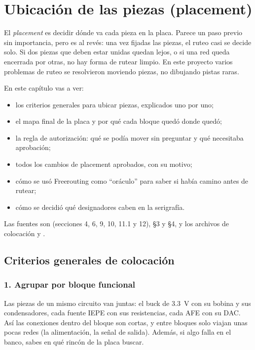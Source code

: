 \chapter{Ubicación de las piezas (placement)}\label{cap:placement}

El \emph{placement} es decidir dónde va cada pieza en la placa. Parece un paso previo sin importancia, pero es al
revés: una vez fijadas las piezas, el ruteo casi se decide solo. Si dos piezas que deben estar unidas quedan lejos,
o si una red queda encerrada por otras, no hay forma de rutear limpio. En este proyecto varios problemas de ruteo se
resolvieron moviendo piezas, no dibujando pistas raras.

En este capítulo vas a ver:
\begin{itemize}
  \item los criterios generales para ubicar piezas, explicados uno por uno;
  \item el mapa final de la placa y por qué cada bloque quedó donde quedó;
  \item la regla de autorización: qué se podía mover sin preguntar y qué necesitaba aprobación;
  \item todos los cambios de placement aprobados, con su motivo;
  \item cómo se usó Freerouting como ``oráculo'' para saber si había camino antes de rutear;
  \item cómo se decidió qué designadores caben en la serigrafía.
\end{itemize}

Las fuentes son  (secciones 4, 6, 9, 10, 11.1 y 12),  §3 y §4, y los
archivos de colocación  y .

\section{Criterios generales de colocación}\label{sec:c07-criterios}

\subsection{1. Agrupar por bloque funcional}
Las piezas de un mismo circuito van juntas: el buck de \SI{3.3}{\volt} con su bobina y sus condensadores, cada
fuente IEPE con sus resistencias, cada AFE con su DAC. Así las conexiones dentro del bloque son cortas, y entre
bloques solo viajan unas pocas redes (la alimentación, la señal de salida). Además, si algo falla en el banco, sabes
en qué rincón de la placa buscar.

